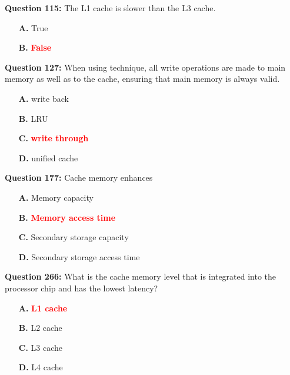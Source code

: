 \documentclass[12pt,a4paper]{article}
\begin{document}
\textbf{Question 115:} The L1 cache is slower than the L3 cache.

\begin{itemize}
    \item[\textbf{A.}] True
    \item[\textbf{B.}] \textcolor{red}{\textbf{False}}
\end{itemize}

\vspace{0.5cm}

\vspace{0.5cm}

\textbf{Question 127:} When using \underline{\hspace{1.5cm}} technique, all write operations are made to main memory as well as to the cache, ensuring that main memory is always valid.

\begin{itemize}
    \item[\textbf{A.}] write back
    \item[\textbf{B.}] LRU
    \item[\textbf{C.}] \textcolor{red}{\textbf{write through}}
    \item[\textbf{D.}] unified cache
\end{itemize}

\vspace{0.5cm}

\vspace{0.5cm}

\textbf{Question 177:} Cache memory enhances

\begin{itemize}
    \item[\textbf{A.}] Memory capacity
    \item[\textbf{B.}] \textcolor{red}{\textbf{Memory access time}}
    \item[\textbf{C.}] Secondary storage capacity
    \item[\textbf{D.}] Secondary storage access time
\end{itemize}

\vspace{0.5cm}

\vspace{0.5cm}

\textbf{Question 266:} What is the cache memory level that is integrated into the processor chip and has the lowest latency?

\begin{itemize}
    \item[\textbf{A.}] \textcolor{red}{\textbf{L1 cache}}
    \item[\textbf{B.}] L2 cache
    \item[\textbf{C.}] L3 cache
    \item[\textbf{D.}] L4 cache
\end{itemize}
\end{document}
